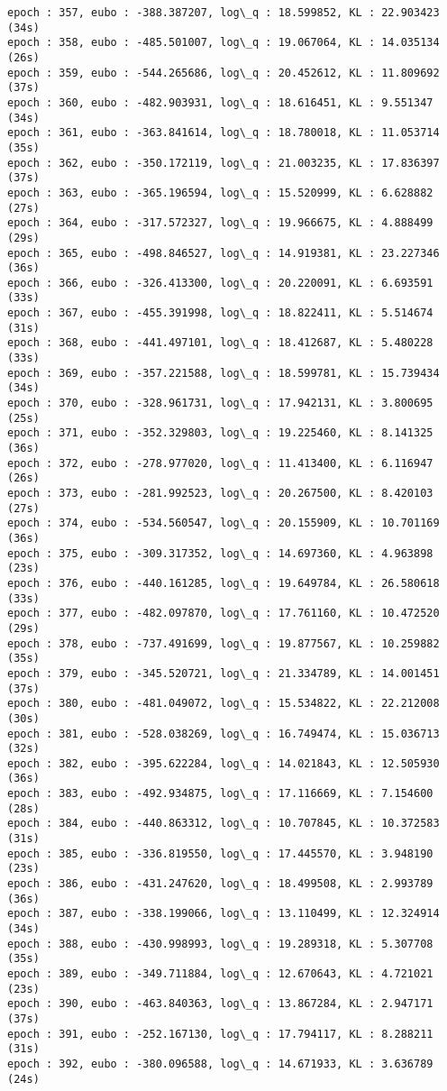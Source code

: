 \documentclass[11pt]{article}
\begin{document}
\begin{Verbatim}[commandchars=\\\{\}]
epoch : 357, eubo : -388.387207, log\_q : 18.599852, KL : 22.903423 (34s)
epoch : 358, eubo : -485.501007, log\_q : 19.067064, KL : 14.035134 (26s)
epoch : 359, eubo : -544.265686, log\_q : 20.452612, KL : 11.809692 (37s)
epoch : 360, eubo : -482.903931, log\_q : 18.616451, KL : 9.551347 (34s)
epoch : 361, eubo : -363.841614, log\_q : 18.780018, KL : 11.053714 (35s)
epoch : 362, eubo : -350.172119, log\_q : 21.003235, KL : 17.836397 (37s)
epoch : 363, eubo : -365.196594, log\_q : 15.520999, KL : 6.628882 (27s)
epoch : 364, eubo : -317.572327, log\_q : 19.966675, KL : 4.888499 (29s)
epoch : 365, eubo : -498.846527, log\_q : 14.919381, KL : 23.227346 (36s)
epoch : 366, eubo : -326.413300, log\_q : 20.220091, KL : 6.693591 (33s)
epoch : 367, eubo : -455.391998, log\_q : 18.822411, KL : 5.514674 (31s)
epoch : 368, eubo : -441.497101, log\_q : 18.412687, KL : 5.480228 (33s)
epoch : 369, eubo : -357.221588, log\_q : 18.599781, KL : 15.739434 (34s)
epoch : 370, eubo : -328.961731, log\_q : 17.942131, KL : 3.800695 (25s)
epoch : 371, eubo : -352.329803, log\_q : 19.225460, KL : 8.141325 (36s)
epoch : 372, eubo : -278.977020, log\_q : 11.413400, KL : 6.116947 (26s)
epoch : 373, eubo : -281.992523, log\_q : 20.267500, KL : 8.420103 (27s)
epoch : 374, eubo : -534.560547, log\_q : 20.155909, KL : 10.701169 (36s)
epoch : 375, eubo : -309.317352, log\_q : 14.697360, KL : 4.963898 (23s)
epoch : 376, eubo : -440.161285, log\_q : 19.649784, KL : 26.580618 (33s)
epoch : 377, eubo : -482.097870, log\_q : 17.761160, KL : 10.472520 (29s)
epoch : 378, eubo : -737.491699, log\_q : 19.877567, KL : 10.259882 (35s)
epoch : 379, eubo : -345.520721, log\_q : 21.334789, KL : 14.001451 (37s)
epoch : 380, eubo : -481.049072, log\_q : 15.534822, KL : 22.212008 (30s)
epoch : 381, eubo : -528.038269, log\_q : 16.749474, KL : 15.036713 (32s)
epoch : 382, eubo : -395.622284, log\_q : 14.021843, KL : 12.505930 (36s)
epoch : 383, eubo : -492.934875, log\_q : 17.116669, KL : 7.154600 (28s)
epoch : 384, eubo : -440.863312, log\_q : 10.707845, KL : 10.372583 (31s)
epoch : 385, eubo : -336.819550, log\_q : 17.445570, KL : 3.948190 (23s)
epoch : 386, eubo : -431.247620, log\_q : 18.499508, KL : 2.993789 (36s)
epoch : 387, eubo : -338.199066, log\_q : 13.110499, KL : 12.324914 (34s)
epoch : 388, eubo : -430.998993, log\_q : 19.289318, KL : 5.307708 (35s)
epoch : 389, eubo : -349.711884, log\_q : 12.670643, KL : 4.721021 (23s)
epoch : 390, eubo : -463.840363, log\_q : 13.867284, KL : 2.947171 (37s)
epoch : 391, eubo : -252.167130, log\_q : 17.794117, KL : 8.288211 (31s)
epoch : 392, eubo : -380.096588, log\_q : 14.671933, KL : 3.636789 (24s)

\end{Verbatim}
\end{document}
